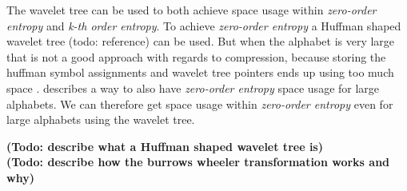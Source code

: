 The wavelet tree can be used to both achieve space usage within \textit{zero-order entropy} and \textit{k-th order entropy}. To achieve \textit{zero-order entropy} a Huffman shaped wavelet tree (todo: reference) can be used. But when the alphabet is very large that is not a good approach with regards to compression, because storing the huffman symbol assignments and wavelet tree pointers ends up using too much space . \citep[Section~3]{Claude08practicalrankselect} describes a way to also have \textit{zero-order entropy} space usage for large alphabets. 
We can therefore get space usage within \textit{zero-order entropy} even for large alphabets using the wavelet tree. 

\noindent\textbf{(Todo: describe what a Huffman shaped wavelet tree is)}\\
\textbf{(Todo: describe how the burrows wheeler transformation works and why)}





